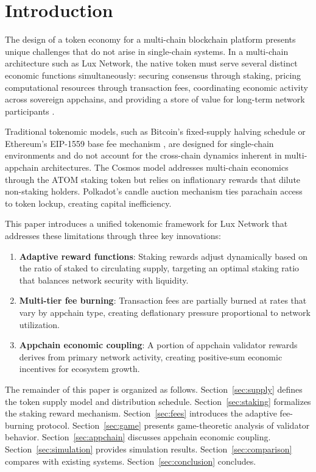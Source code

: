 \section{Introduction}


The design of a token economy for a multi-chain blockchain platform presents unique challenges that do not arise in single-chain systems. In a multi-chain architecture such as Lux Network, the native token must serve several distinct economic functions simultaneously: securing consensus through staking, pricing computational resources through transaction fees, coordinating economic activity across sovereign appchains, and providing a store of value for long-term network participants \cite{nakamoto2008bitcoin, buterin2014ethereum}.

Traditional tokenomic models, such as Bitcoin's fixed-supply halving schedule \cite{nakamoto2008bitcoin} or Ethereum's EIP-1559 base fee mechanism \cite{roughgarden2020eip1559}, are designed for single-chain environments and do not account for the cross-chain dynamics inherent in multi-appchain architectures. The Cosmos model \cite{kwon2016cosmos} addresses multi-chain economics through the ATOM staking token but relies on inflationary rewards that dilute non-staking holders. Polkadot's candle auction mechanism \cite{wood2016polkadot} ties parachain access to token lockup, creating capital inefficiency.

This paper introduces a unified tokenomic framework for Lux Network that addresses these limitations through three key innovations:

\begin{enumerate}[label=(\roman*)]
    \item \textbf{Adaptive reward functions}: Staking rewards adjust dynamically based on the ratio of staked to circulating supply, targeting an optimal staking ratio that balances network security with liquidity.
    \item \textbf{Multi-tier fee burning}: Transaction fees are partially burned at rates that vary by appchain type, creating deflationary pressure proportional to network utilization.
    \item \textbf{Appchain economic coupling}: A portion of appchain validator rewards derives from primary network activity, creating positive-sum economic incentives for ecosystem growth.
\end{enumerate}

The remainder of this paper is organized as follows. Section~\ref{sec:supply} defines the token supply model and distribution schedule. Section~\ref{sec:staking} formalizes the staking reward mechanism. Section~\ref{sec:fees} introduces the adaptive fee-burning protocol. Section~\ref{sec:game} presents game-theoretic analysis of validator behavior. Section~\ref{sec:appchain} discusses appchain economic coupling. Section~\ref{sec:simulation} provides simulation results. Section~\ref{sec:comparison} compares with existing systems. Section~\ref{sec:conclusion} concludes.

